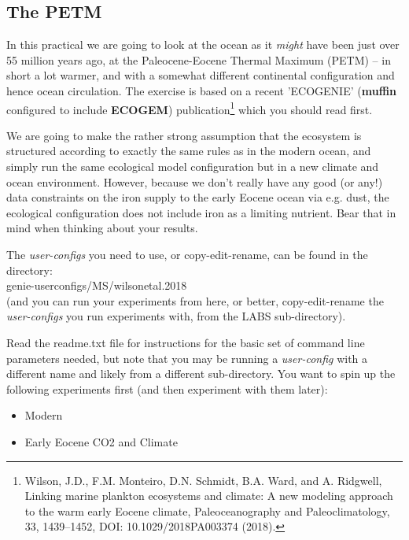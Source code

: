 \documentclass[11pt,fleqn]{book} %
\begin{document}
\newpage
\subsection*{The PETM}

In this practical we are going to look at the ocean as it \textit{might} have been just over 55 million years ago, at the Paleocene-Eocene Thermal Maximum (PETM) -- in short a lot warmer, and with a somewhat different continental configuration and hence ocean circulation. The exercise is based on a recent 'ECOGENIE' (\textbf{muffin} configured to include \textbf{ECOGEM}) publication\footnote{Wilson, J.D., F.M. Monteiro, D.N. Schmidt, B.A. Ward, and A. Ridgwell, Linking marine plankton ecosystems and climate: A new modeling approach to the warm early Eocene climate, Paleoceanography and Paleoclimatology, 33, 1439–1452, DOI: 10.1029/2018PA003374 (2018).} which you should read first.

We are going to make the rather strong assumption that the ecosystem is structured according to exactly the same rules as in the modern ocean, and simply run the same ecological model configuration but in a new climate and ocean environment. However, because we don't really have any good (or any!) data constraints on the iron supply to the early Eocene ocean via e.g. dust, the ecological configuration does not include iron as a limiting nutrient. Bear that in mind when thinking about your results.

The \textit{user-configs} you need to use, or copy-edit-rename, can be found in the directory:
\vspace{1mm}
\\\textsf{\footnotesize genie-userconfigs/MS/wilsonetal.2018}
\vspace{1mm}
\\\noindent(and you can run your experiments from here, or better, copy-edit-rename the \textit{user-configs} you run experiments with, from the \textsf{\footnotesize LABS} sub-directory).

Read the \textsf{\footnotesize readme.txt} file for instructions for the basic set of command line parameters needed, but note that you may be running a \textit{user-config} with a different name and likely from a different sub-directory. You want to spin up the following experiments first (and then experiment with them later):

\vspace{1mm}
\begin{itemize}[noitemsep]
\item[(1)] \textsf{\footnotesize Modern}
\item[(3)] \textsf{\footnotesize Early Eocene CO2 and Climate}
\end{itemize}
\vspace{1mm}
\end{document}
